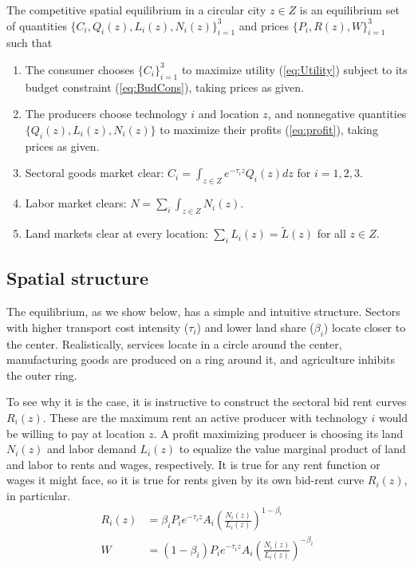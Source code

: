 \documentclass[12pt]{article}
\begin{document}
The competitive spatial equilibrium in a circular city $z\in Z$ is an equilibrium set of quantities $\{C_i, Q_i(z), L_i(z), N_i(z)\}_{i=1}^3$ and prices $\{P_i, R(z), W\}_{i=1}^3$ such that
\begin{enumerate}
    \item The consumer chooses $\{C_i\}_{i=1}^3$ to maximize utility (\ref{eq:Utility}) subject to its budget constraint (\ref{eq:BudCons}), taking prices as given.
    \item The producers choose technology $i$ and location $z$, and nonnegative quantities $\{Q_i(z), L_i(z), N_i(z)\}$ to maximize their profits (\ref{eq:profit}), taking prices as given.
    \item Sectoral goods market clear: $C_i=\int_{z\in Z} e^{-\tau_iz}Q_i(z)dz$ for $i=1,2,3$.
    \item Labor market clears: $N=\sum_i\int_{z\in Z} N_i(z)$.
    \item Land markets clear at every location: $\sum_iL_i(z)=\tilde L(z)$ for all $z\in Z$.
\end{enumerate}

\subsection{Spatial structure}
The equilibrium, as we show below, has a simple and intuitive structure. Sectors with higher transport cost intensity ($\tau_i$) and lower land share ($\beta_i$) locate closer to the center. Realistically, services locate in a circle around the center, manufacturing goods are produced on a ring around it, and agriculture inhibits the outer ring.

To see why it is the case, it is instructive to construct the sectoral bid rent curves $R_i(z)$. These are the maximum rent an active producer with technology $i$ would be willing to pay at location $z$. %
A profit maximizing producer is choosing its land $N_i(z)$ and labor demand $L_i(z)$ to equalize the value marginal product of land and labor to rents and wages, respectively. It is true for any rent function or wages it might face, so it is true for rents given by its own bid-rent curve $R_i(z)$, in particular.
\begin{align}
R_i(z) &=\beta_i P_ie^{-\tau_i z}A_i \left(\frac{N_i(z)}{L_i(z)}\right)^{1-\beta_i}\\
W &=(1-\beta_i) P_ie^{-\tau_i z}A_i \left(\frac{N_i(z)}{L_i(z)}\right)^{-\beta_i}
\end{align}
\end{document}
